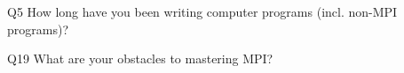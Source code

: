 \begin{description}%
\item{Q5} How long have you been writing computer programs (incl. non-MPI programs)?%
\item{Q19} What are your obstacles to mastering MPI?%
\end{description}%
